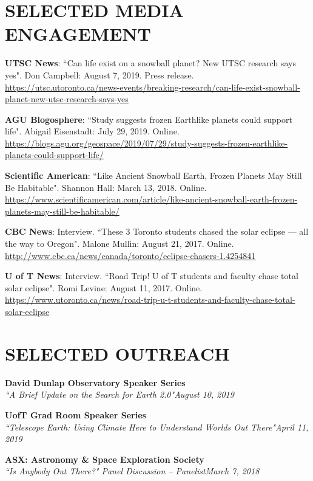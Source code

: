 \documentclass[10pt]{res} %
\begin{document}
\begin{resume}
\section{SELECTED MEDIA ENGAGEMENT}

\textbf{UTSC News}: ``Can life exist on a snowball planet? New UTSC research says yes". Don Campbell: August 7, 2019. Press release. \url{https://utsc.utoronto.ca/news-events/breaking-research/can-life-exist-snowball-planet-new-utsc-research-says-yes}

\textbf{AGU Blogosphere}: ``Study suggests frozen Earthlike planets could support life". Abigail Eisenstadt: July 29, 2019. Online. \url{https://blogs.agu.org/geospace/2019/07/29/study-suggests-frozen-earthlike-planets-could-support-life/}

\textbf{Scientific American}: ``Like Ancient Snowball Earth, Frozen Planets May Still Be Habitable". Shannon Hall: March 13, 2018. Online. \url{https://www.scientificamerican.com/article/like-ancient-snowball-earth-frozen-planets-may-still-be-habitable/}


\textbf{CBC News}: Interview. ``These 3 Toronto students chased the solar eclipse — all the way to Oregon". Malone Mullin: August 21, 2017. Online. \url{http://www.cbc.ca/news/canada/toronto/eclipse-chasers-1.4254841}


\textbf{U of T News}: Interview. ``Road Trip! U of T students and faculty chase total solar eclipse". Romi Levine: August 11, 2017. Online. \url{https://www.utoronto.ca/news/road-trip-u-t-students-and-faculty-chase-total-solar-eclipse}


\section{SELECTED OUTREACH}

\textbf{David Dunlap Observatory Speaker Series}\\
{\sl ``A Brief Update on the Search for Earth 2.0"}\hfill{\sl August 10, 2019}

\textbf{UofT Grad Room Speaker Series}\\
{\sl ``Telescope Earth: Using Climate Here to Understand Worlds Out There"}\hfill{\sl April 11, 2019}

\textbf{ASX: Astronomy \& Space Exploration Society}\\
{\sl ``Is Anybody Out There?" Panel Discussion -- Panelist}\hfill{\sl March 7, 2018}


\end{resume}
\end{document}
